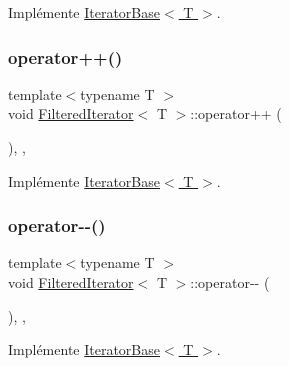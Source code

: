 Implémente \hyperlink{class_iterator_base_abc219468b68f2b5471494d04d00f6ec7}{Iterator\+Base$<$ T $>$}.

\mbox{\label{class_filtered_iterator_ae31347c47637172be3d19dc3be30f5cc}} 
\subsubsection{\texorpdfstring{operator++()}{operator++()}}
{\footnotesize\ttfamily template$<$typename T $>$ \\
void \hyperlink{class_filtered_iterator}{Filtered\+Iterator}$<$ T $>$\+::operator++ (\begin{DoxyParamCaption}{ }\end{DoxyParamCaption})\hspace{0.3cm}{\ttfamily [inline]}, {\ttfamily [override]}, {\ttfamily [virtual]}}



Implémente \hyperlink{class_iterator_base_a816f35e9020716d212124a34f1c033fb}{Iterator\+Base$<$ T $>$}.

\mbox{\label{class_filtered_iterator_a860a37fdf31e87a96b80cb295e6d34c2}} 
\subsubsection{\texorpdfstring{operator-\/-\/()}{operator--()}}
{\footnotesize\ttfamily template$<$typename T $>$ \\
void \hyperlink{class_filtered_iterator}{Filtered\+Iterator}$<$ T $>$\+::operator-\/-\/ (\begin{DoxyParamCaption}{ }\end{DoxyParamCaption})\hspace{0.3cm}{\ttfamily [inline]}, {\ttfamily [override]}, {\ttfamily [virtual]}}



Implémente \hyperlink{class_iterator_base_aa9bf0f75a8bb7e4d416a9b88ccacd9c7}{Iterator\+Base$<$ T $>$}.

\mbox{\label{class_filtered_iterator_a413726d7cc9a951d0a30eaee6cf36de1}} 
